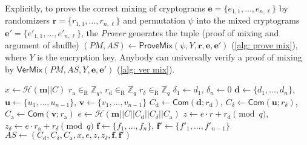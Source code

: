 Explicitly, to prove the correct mixing of cryptograms $\boldsymbol{e} = \{ e_{1, 1}, ..., e_{n, \ell} \}$ by randomizers $\boldsymbol{r} = \{ r_{1, 1}, ..., r_{n, \ell} \}$ and permutation $\psi$ into the mixed cryptograms $\boldsymbol{e'} = \{ e'_{1, 1}, ..., e'_{n, \ell} \}$, the \textit{Prover} generates the tuple (proof of mixing and argument of shuffle) $(PM, AS) \gets \mathsf{ProveMix}(\psi, Y, \boldsymbol{r}, \boldsymbol{e}, \boldsymbol{e'})$ (\cref{alg: prove mix}), where $Y$ is the encryption key. Anybody can universally verify a proof of mixing by $\mathsf{VerMix}(PM, AS, Y, \boldsymbol{e}, \boldsymbol{e'})$ (\cref{alg: ver mix}).

\begin{algorithm}[ht]
    \DontPrintSemicolon
    \caption{$\mathsf{ProveASKC}(\psi; r; \boldsymbol{m}; C)$}
    
    $x \gets \mathcal{H}(\boldsymbol{m} || C)$ \;
    $r_\mathrm{a} \in_\mathrm{R} \mathbb{Z}_q$, $r_\mathrm{d} \in_\mathrm{R} \mathbb{Z}_q$ $r_\delta \in_\mathrm{R} \mathbb{Z}_q$ \;
    $\delta_1 \gets d_1$, $\delta_n \gets 0$ \;
    $\boldsymbol{d} \gets \{ d_1, ..., d_n \}$, $\boldsymbol{u} \gets \{ u_1, ..., u_{n-1} \}$, $\boldsymbol{v} \gets \{ v_1, ..., v_{n-1} \}$ \;
    $C_\mathrm{d} \gets \mathsf{Com} (\boldsymbol{d}; r_\mathrm{d})$, $C_\delta \gets \mathsf{Com} (\boldsymbol{u}; r_\delta)$, $C_\mathrm{a} \gets \mathsf{Com} (\boldsymbol{v}; r_\mathrm{a})$ \;
    $e \gets \mathcal{H}(\boldsymbol{m} || C || C_\mathrm{d} || C_\delta || C_\mathrm{a})$ \;
    $z \gets e \cdot r + r_\mathrm{d} \pmod q$, $z_\delta \gets e \cdot r_\mathrm{a} + r_\delta \pmod q$ \;
    $\boldsymbol{f} \gets \{ f_1, ..., f_n \}$, $\boldsymbol{f'} \gets \{ f'_1, ..., f'_{n-1} \}$ \;
    $AS \gets (C_\mathrm{d}, C_\delta, C_\mathrm{a}, x, e, z, z_\delta, \boldsymbol{f}, \boldsymbol{f'})$ \;
    
     
    
    \label{alg: prove askc}
\end{algorithm}

